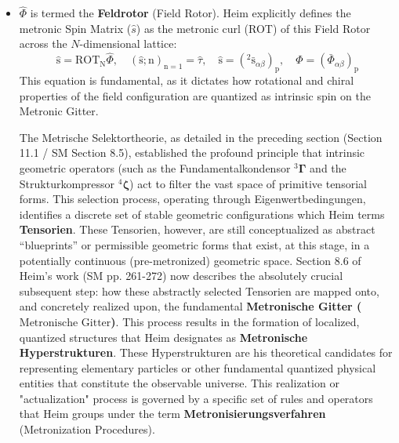 \documentclass[12pt]{article}
\newcommand{\q}[1]{\enquote{#1}}
\newcommand{\fundamentalkondensor}{{}^3\bm{\Gamma}}
\newcommand{\metronischegitter}{\text{Metronische Gitter}}
\newcommand{\strukturkompressor}{{}^4\bm{\zeta}}
\begin{document}
\begin{itemize}
\item $\hat{\Phi}$ is termed the \textbf{Feldrotor} (Field Rotor). Heim explicitly defines the metronic Spin Matrix ($\hat{s}$) as the metronic curl (ROT) of this Field Rotor across the $N$-dimensional lattice:
            \begin{equation}
            \hat{\mathrm{s}} = \mathrm{ROT}_\mathrm{N} \widehat{\Phi}, \quad (\hat{\mathrm{s}};\mathrm{n})_{\mathrm{n=1}} = \hat{\tau}, \quad \hat{\mathrm{s}} = \left({}^2\bar{\mathrm{s}}_{\alpha\beta}\right)_\mathrm{p}, \quad \widehat{\Phi} = \left( \bar{\Phi}_{\alpha\beta} \right)_\mathrm{p}
            \tag{87}
            \label{eq:original_spinmatrix_rotor}
            \end{equation}
            This equation is fundamental, as it dictates how rotational and chiral properties of the field configuration are quantized as intrinsic spin on the Metronic Gitter.


The Metrische Selektortheorie, as detailed in the preceding section (Section 11.1 / SM Section 8.5), established the profound principle that intrinsic geometric operators (such as the Fundamentalkondensor \( \fundamentalkondensor \) and the Strukturkompressor \( \strukturkompressor \)) act to filter the vast space of primitive tensorial forms. This selection process, operating through Eigenwertbedingungen, identifies a discrete set of stable geometric configurations which Heim terms \textbf{Tensorien}. These Tensorien, however, are still conceptualized as abstract \q{blueprints} or permissible geometric forms that exist, at this stage, in a potentially continuous (pre-metronized) geometric space. Section 8.6 of Heim's work (SM pp. 261-272) now describes the absolutely crucial subsequent step: how these abstractly selected Tensorien are mapped onto, and concretely realized upon, the fundamental \textbf{Metronische Gitter (\(\metronischegitter\))}. This process results in the formation of localized, quantized structures that Heim designates as \textbf{Metronische Hyperstrukturen}. These Hyperstrukturen are his theoretical candidates for representing elementary particles or other fundamental quantized physical entities that constitute the observable universe. This realization or "actualization" process is governed by a specific set of rules and operators that Heim groups under the term \textbf{Metronisierungsverfahren} (Metronization Procedures).
\end{itemize}
\end{document}
